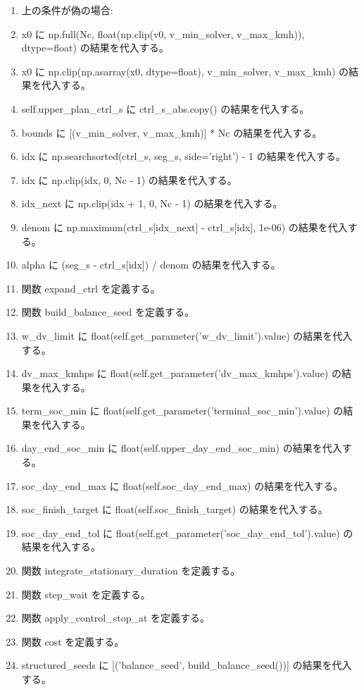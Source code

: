 \documentclass[a4paper,11pt]{article}
\begin{document}
\begin{enumerate}[leftmargin=1.8em]
\item       上の条件が偽の場合:
\item       x0 に np.full(Nc, float(np.clip(v0, v\_min\_solver, v\_max\_kmh)), dtype=float) の結果を代入する。
\item x0 に np.clip(np.asarray(x0, dtype=float), v\_min\_solver, v\_max\_kmh) の結果を代入する。
\item self.upper\_plan\_ctrl\_s に ctrl\_s\_abs.copy() の結果を代入する。
\item bounds に [(v\_min\_solver, v\_max\_kmh)] * Nc の結果を代入する。
\item idx に np.searchsorted(ctrl\_s, seg\_s, side='right') - 1 の結果を代入する。
\item idx に np.clip(idx, 0, Nc - 1) の結果を代入する。
\item idx\_next に np.clip(idx + 1, 0, Nc - 1) の結果を代入する。
\item denom に np.maximum(ctrl\_s[idx\_next] - ctrl\_s[idx], 1e-06) の結果を代入する。
\item alpha に (seg\_s - ctrl\_s[idx]) / denom の結果を代入する。
\item 関数 expand\_ctrl を定義する。
\item 関数 build\_balance\_seed を定義する。
\item w\_dv\_limit に float(self.get\_parameter('w\_dv\_limit').value) の結果を代入する。
\item dv\_max\_kmhps に float(self.get\_parameter('dv\_max\_kmhps').value) の結果を代入する。
\item term\_soc\_min に float(self.get\_parameter('terminal\_soc\_min').value) の結果を代入する。
\item day\_end\_soc\_min に float(self.upper\_day\_end\_soc\_min) の結果を代入する。
\item soc\_day\_end\_max に float(self.soc\_day\_end\_max) の結果を代入する。
\item soc\_finish\_target に float(self.soc\_finish\_target) の結果を代入する。
\item soc\_day\_end\_tol に float(self.get\_parameter('soc\_day\_end\_tol').value) の結果を代入する。
\item 関数 integrate\_stationary\_duration を定義する。
\item 関数 step\_wait を定義する。
\item 関数 apply\_control\_stop\_at を定義する。
\item 関数 cost を定義する。
\item structured\_seeds に [('balance\_seed', build\_balance\_seed())] の結果を代入する。

\end{enumerate}
\end{document}
